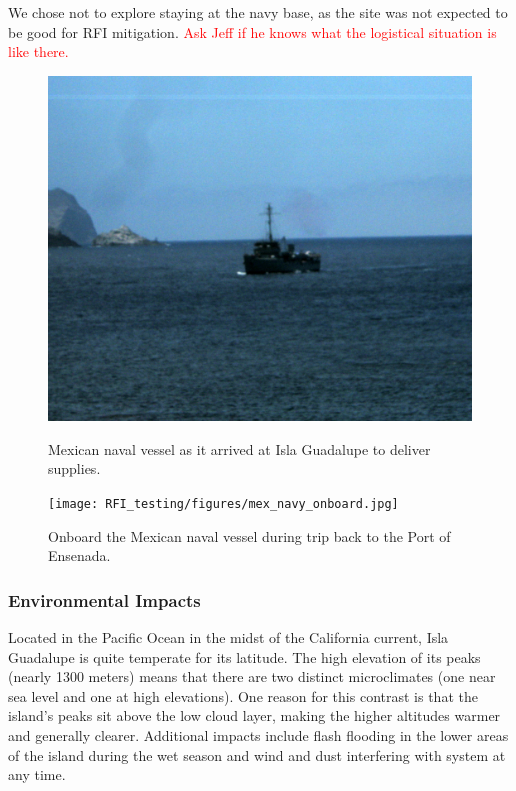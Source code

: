 We chose not to explore staying at the navy base, as the site was not expected to be good for RFI mitigation. \textcolor{red}{Ask Jeff if he knows what the logistical situation is like there.}

\begin{figure}[htb]
\centering
\begin{minipage}[b]{0.47\textwidth}
\centering
\includegraphics[width=0.95\linewidth]{RFI_testing/figures/mex_navy_arrival.jpg}
\caption{Mexican naval vessel as it arrived at Isla Guadalupe to deliver supplies.}
\label{Fig:guadboat}
\end{minipage}%
\begin{minipage}[b]{0.02\textwidth}
\hspace{1cm}
\end{minipage}%
\begin{minipage}[b]{0.47\textwidth}
\centering
\texttt{[image: RFI\_testing/figures/mex\_navy\_onboard.jpg]}
\caption{Onboard the Mexican naval vessel during trip back to the Port of Ensenada.}
\label{Fig:guadonboard}
\end{minipage}
\end{figure}

\subsubsection{Environmental Impacts}

Located in the Pacific Ocean in the midst of the California current, Isla Guadalupe is quite temperate for its latitude. The high elevation of its peaks (nearly 1300 meters) means that there are two distinct microclimates (one near sea level and one at high elevations). One reason for this contrast is that the island's peaks sit above the low cloud layer, making the higher altitudes warmer and generally clearer. Additional impacts include flash flooding in the lower areas of the island during the wet season and wind and dust interfering with system at any time. 


